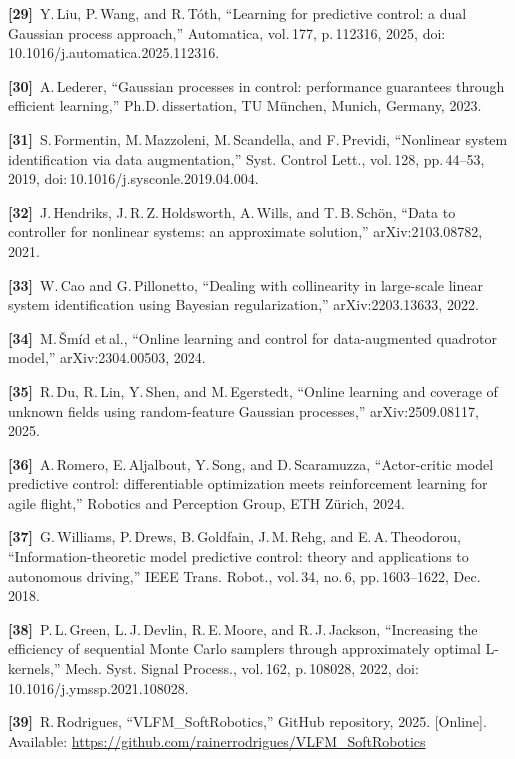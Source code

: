 \documentclass[letterpaper, 10pt, journal, twoside]{IEEEtran}
\begin{document}
\textbf{{[}29{]} }Y.\,Liu, P.\,Wang, and R.\,Tóth, ``Learning for
predictive control: a dual Gaussian process approach,'' Automatica,
vol.\,177, p.\,112316, 2025, doi:\,10.1016/j.automatica.2025.112316.

\textbf{{[}30{]} }A.\,Lederer, ``Gaussian processes in control:
performance guarantees through efficient learning,''
Ph.D.\,dissertation, TU München, Munich, Germany, 2023.

\textbf{{[}31{]} }S.\,Formentin, M.\,Mazzoleni, M.\,Scandella, and
F.\,Previdi, ``Nonlinear system identification via data augmentation,''
Syst. Control Lett., vol.\,128, pp.\,44--53, 2019,
doi:\,10.1016/j.sysconle.2019.04.004.

\textbf{{[}32{]} }J.\,Hendriks, J.\,R.\,Z.\,Holdsworth, A.\,Wills, and
T.\,B.\,Schön, ``Data to controller for nonlinear systems: an
approximate solution,'' arXiv:2103.08782, 2021.

\textbf{{[}33{]} }W.\,Cao and G.\,Pillonetto, ``Dealing with
collinearity in large-scale linear system identification using Bayesian
regularization,'' arXiv:2203.13633, 2022.

\textbf{{[}34{]} }M.\,Šmíd et\,al., ``Online learning and control for
data-augmented quadrotor model,'' arXiv:2304.00503, 2024.

\textbf{{[}35{]} }R.\,Du, R.\,Lin, Y.\,Shen, and M.\,Egerstedt, ``Online
learning and coverage of unknown fields using random-feature Gaussian
processes,'' arXiv:2509.08117, 2025.

\textbf{{[}36{]} }A.\,Romero, E.\,Aljalbout, Y.\,Song, and
D.\,Scaramuzza, ``Actor-critic model predictive control: differentiable
optimization meets reinforcement learning for agile flight,'' Robotics
and Perception Group, ETH Zürich, 2024.

\textbf{{[}37{]} }G.\,Williams, P.\,Drews, B.\,Goldfain, J.\,M.\,Rehg,
and E.\,A.\,Theodorou, ``Information-theoretic model predictive control:
theory and applications to autonomous driving,'' IEEE Trans. Robot.,
vol.\,34, no.\,6, pp.\,1603--1622, Dec.\,2018.

\textbf{{[}38{]} }P.\,L.\,Green, L.\,J.\,Devlin, R.\,E.\,Moore, and
R.\,J.\,Jackson, ``Increasing the efficiency of sequential Monte Carlo
samplers through approximately optimal L-kernels,'' Mech. Syst. Signal
Process., vol.\,162, p.\,108028, 2022,
doi:\,10.1016/j.ymssp.2021.108028.

\textbf{{[}39{]} }R.\,Rodrigues, ``VLFM\_SoftRobotics,'' GitHub
repository, 2025. {[}Online{]}. Available:
\ul{https://github.com/rainerrodrigues/VLFM\_SoftRobotics}
\end{document}
